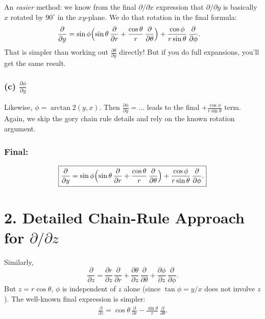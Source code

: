 \documentclass[12pt]{article}
\begin{document}
An \emph{easier} method: we know from the final $\partial/\partial x$ expression that $\partial/\partial y$ is basically $\hat{x}$ rotated by $90^\circ$ in the $xy$-plane. We do that rotation in the final formula:
\begin{align*}
\frac{\partial}{\partial y}
&= \sin\phi\Bigl(\sin\theta\,\frac{\partial}{\partial r} + \frac{\cos\theta}{r}\,\frac{\partial}{\partial \theta}\Bigr)
+ \frac{\cos\phi}{r\sin\theta}\,\frac{\partial}{\partial \phi}.
\end{align*}
That is simpler than working out $\frac{\partial \theta}{\partial y}$ directly! But if you do full expansions, you'll get the same result.

\subsubsection*{(c) $\frac{\partial \phi}{\partial y}$}
Likewise, $\phi = \arctan2(y,x)$. Then $\frac{\partial \phi}{\partial y} = \ldots$ leads to the final $+\frac{\cos\phi}{r\sin\theta}$ term. Again, we skip the gory chain rule details and rely on the known rotation argument.

\subsubsection*{Final:}
\[
\boxed{
\frac{\partial}{\partial y}
= \sin\phi\Bigl(\sin\theta\,\frac{\partial}{\partial r}
+ \frac{\cos\theta}{r}\,\frac{\partial}{\partial \theta}\Bigr)
+ \frac{\cos\phi}{r\sin\theta}\,\frac{\partial}{\partial \phi}.
}
\]

\section*{2. Detailed Chain-Rule Approach for $\partial/\partial z$}
Similarly,
\begin{equation}
\frac{\partial}{\partial z} = \frac{\partial r}{\partial z}\,\frac{\partial}{\partial r}
+ \frac{\partial \theta}{\partial z}\,\frac{\partial}{\partial \theta}
+ \frac{\partial \phi}{\partial z}\,\frac{\partial}{\partial \phi}.
\end{equation}
But $z=r\cos\theta$, $\phi$ is independent of $z$ alone (since $\tan\phi = y/x$ does not involve $z$). The well-known final expression is simpler:
\begin{align*}
\frac{\partial}{\partial z}
= \cos\theta\,\frac{\partial}{\partial r}
- \frac{\sin\theta}{r}\,\frac{\partial}{\partial \theta}.
\end{align*}
\end{document}
